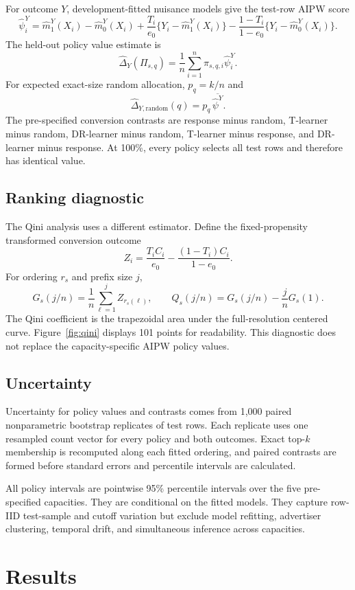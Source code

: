 \documentclass[11pt]{article}
\begin{document}
For outcome $Y$, development-fitted nuisance models give the test-row AIPW score
\[
\widehat{\psi}_i^Y =
\widehat m_1^Y(X_i)-\widehat m_0^Y(X_i)
+\frac{T_i}{e_0}\{Y_i-\widehat m_1^Y(X_i)\}
-\frac{1-T_i}{1-e_0}\{Y_i-\widehat m_0^Y(X_i)\}.
\]
The held-out policy value estimate is
\[
\widehat{\Delta}_Y(\Pi_{s,q})
=\frac{1}{n}\sum_{i=1}^{n}\pi_{s,q,i}\widehat{\psi}_i^Y.
\]
For expected exact-size random allocation, $p_q=k/n$ and
\[
\widehat{\Delta}_{Y,\mathrm{random}}(q)
=p_q\,\overline{\widehat{\psi}^Y}.
\]
The pre-specified conversion contrasts are response minus random, T-learner minus random, DR-learner minus random, T-learner minus response, and DR-learner minus response. At 100\%, every policy selects all test rows and therefore has identical value.

\subsection{Ranking diagnostic}

The Qini analysis uses a different estimator. Define the fixed-propensity transformed conversion outcome
\[
Z_i=\frac{T_iC_i}{e_0}-\frac{(1-T_i)C_i}{1-e_0}.
\]
For ordering $r_s$ and prefix size $j$,
\[
G_s(j/n)=\frac{1}{n}\sum_{\ell=1}^{j}Z_{r_s(\ell)},
\qquad
Q_s(j/n)=G_s(j/n)-\frac{j}{n}G_s(1).
\]
The Qini coefficient is the trapezoidal area under the full-resolution centered curve. Figure~\ref{fig:qini} displays 101 points for readability. This diagnostic does not replace the capacity-specific AIPW policy values.

\subsection{Uncertainty}

Uncertainty for policy values and contrasts comes from 1,000 paired nonparametric bootstrap replicates of test rows. Each replicate uses one resampled count vector for every policy and both outcomes. Exact top-$k$ membership is recomputed along each fitted ordering, and paired contrasts are formed before standard errors and percentile intervals are calculated.

All policy intervals are pointwise 95\% percentile intervals over the five pre-specified capacities. They are conditional on the fitted models. They capture row-IID test-sample and cutoff variation but exclude model refitting, advertiser clustering, temporal drift, and simultaneous inference across capacities.

\section{Results}
\end{document}
